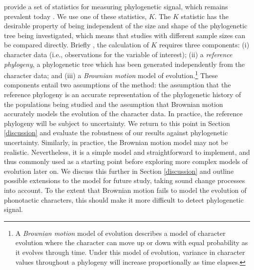 \textcite{blomberg_testing_2003} provide a set of statistics for measuring phylogenetic signal, which remains prevalent today \autocites[for example,][]{balisi_dietary_2018}{hutchinson_contemporary_2018}{leff_predicting_2018}. We use one of these statistics, \(K\). The \(K\) statistic has the desirable property of being independent of the size and shape of the phylogenetic tree being investigated, which means that studies with different sample sizes can be compared directly. Briefly \autocite[following][p.~722]{blomberg_testing_2003}, the calculation of \(K\) requires three components: (i) character data (i.e., observations for the variable of interest); (ii) a \emph{reference phylogeny}, a phylogenetic tree which has been generated independently from the character data; and (iii) a \emph{Brownian motion} model of evolution.\footnote{A \emph{Brownian motion} model of evolution describes a model of character evolution where the character can move up or down with equal probability as it evolves through time. Under this model of evolution, variance in character values throughout a phylogeny will increase proportionally as time elapses.} These components entail two assumptions of the method: the assumption that the reference phylogeny is an accurate representation of the phylogenetic history of the populations being studied and the assumption that Brownian motion accurately models the evolution of the character data. In practice, the reference phylogeny will be subject to uncertainty. We return to this point in Section \ref{discussion} and evaluate the robustness of our results against phylogenetic uncertainty. Similarly, in practice, the Brownian motion model may not be realistic. Nevertheless, it is a simple model and straightforward to implement, and thus commonly used as a starting point before exploring more complex models of evolution later on. We discuss this further in Section \ref{discussion} and outline possible extensions to the model for future study, taking sound change processes into account. To the extent that Brownian motion fails to model the evolution of phonotactic characters, this should make it more difficult to detect phylogenetic signal.

